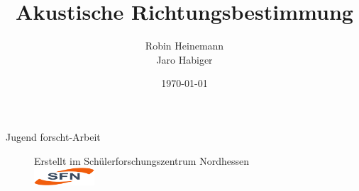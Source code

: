 \documentclass[10pt,a4paper]{article}
\title{Akustische Richtungsbestimmung}
\author{Robin Heinemann\\ Jaro Habiger}
\date{\today}
\begin{document}
  \begin{centering}
  	Jugend forscht-Arbeit
  	{\let\newpage\relax\maketitle}
  	\begin{figure}
  		\centering
  		{\large Erstellt im Schülerforschungszentrum Nordhessen}\\
  		\vspace{20pt}
  		\includegraphics[width=0.2\textwidth]{img/sfn}
  	\end{figure}
  \end{centering}
  \thispagestyle{empty}
  \newpage
  \tableofcontents
  \thispagestyle{empty}
  
  \newpage
  \setcounter{page}{1}

  \begingroup
    \let\clearpage\relax
    
    
    
    
    
    
    
    
    
    
  \endgroup

  \pagebreak %
  \setcounter{page}{1}
  \printbibliography
\end{document}
